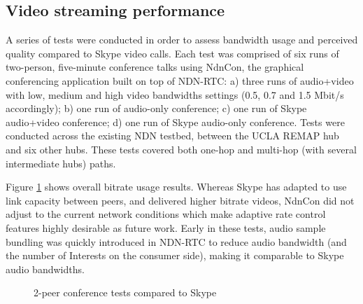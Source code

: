 \documentclass{icn/sig-alternate-2013} %
\newcommand{\ndnrtcName}{NDN-RTC} %
\newcommand{\ndnconName}{NdnCon}
\begin{document}
\subsection{Video streaming performance}
A series of tests were conducted in order to assess bandwidth usage and perceived quality compared to Skype video calls. Each test was comprised of six runs of two-person, five-minute conference talks using \ndnconName{}, the graphical conferencing application built on top of \ndnrtcName{}: a) three runs of audio+video with low, medium and high video bandwidths settings (0.5, 0.7 and 1.5 Mbit/s accordingly); b) one run of audio-only conference; c) one run of Skype audio+video conference; d) one run of Skype audio-only conference. Tests were conducted across the existing NDN testbed, between the UCLA REMAP hub and six other hubs.  These tests covered both one-hop and multi-hop (with several intermediate hubs) paths. 


Figure \ref{fig:tests-skype} shows overall bitrate usage results. Whereas Skype has adapted to use link capacity between peers, and delivered higher bitrate videos, NdnCon did not adjust to the current network conditions which make adaptive rate control features highly desirable as future work. Early in these tests, audio sample bundling was quickly introduced in \ndnrtcName{} to reduce audio bandwidth (and the number of Interests on the consumer side), making it comparable to Skype audio bandwidths.

%

\begin{figure}[t!]
\centering
\begin{scriptsize}
\def\svgwidth{0.53\textwidth}
\end{scriptsize}
\vspace{-18pt}
\caption{2-peer conference tests compared to Skype}
\label{fig:tests-skype}
\end{figure}

\end{document}
